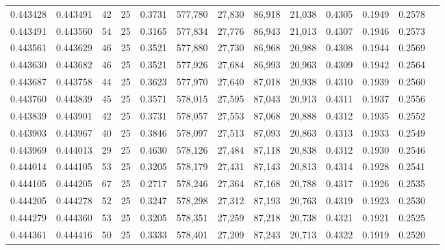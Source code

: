 \begin{tabular}{rrrrrrrrrrrrr}
0.443428 & 0.443491 &    42 &  25 &                                     0.3731 & 577,780 &  27,830 &  86,918 &  21,038 & 0.4305 & 0.1949 & 0.2578 \\
0.443491 & 0.443560 &    54 &  25 &                                     0.3165 & 577,834 &  27,776 &  86,943 &  21,013 & 0.4307 & 0.1946 & 0.2573 \\
0.443561 & 0.443629 &    46 &  25 &                                     0.3521 & 577,880 &  27,730 &  86,968 &  20,988 & 0.4308 & 0.1944 & 0.2569 \\
0.443630 & 0.443682 &    46 &  25 &                                     0.3521 & 577,926 &  27,684 &  86,993 &  20,963 & 0.4309 & 0.1942 & 0.2564 \\
0.443687 & 0.443758 &    44 &  25 &                                     0.3623 & 577,970 &  27,640 &  87,018 &  20,938 & 0.4310 & 0.1939 & 0.2560 \\
0.443760 & 0.443839 &    45 &  25 &                                     0.3571 & 578,015 &  27,595 &  87,043 &  20,913 & 0.4311 & 0.1937 & 0.2556 \\
0.443839 & 0.443901 &    42 &  25 &                                     0.3731 & 578,057 &  27,553 &  87,068 &  20,888 & 0.4312 & 0.1935 & 0.2552 \\
0.443903 & 0.443967 &    40 &  25 &                                     0.3846 & 578,097 &  27,513 &  87,093 &  20,863 & 0.4313 & 0.1933 & 0.2549 \\
0.443969 & 0.444013 &    29 &  25 &                                     0.4630 & 578,126 &  27,484 &  87,118 &  20,838 & 0.4312 & 0.1930 & 0.2546 \\
0.444014 & 0.444105 &    53 &  25 &                                     0.3205 & 578,179 &  27,431 &  87,143 &  20,813 & 0.4314 & 0.1928 & 0.2541 \\
0.444105 & 0.444205 &    67 &  25 &                                     0.2717 & 578,246 &  27,364 &  87,168 &  20,788 & 0.4317 & 0.1926 & 0.2535 \\
0.444205 & 0.444278 &    52 &  25 &                                     0.3247 & 578,298 &  27,312 &  87,193 &  20,763 & 0.4319 & 0.1923 & 0.2530 \\
0.444279 & 0.444360 &    53 &  25 &                                     0.3205 & 578,351 &  27,259 &  87,218 &  20,738 & 0.4321 & 0.1921 & 0.2525 \\
0.444361 & 0.444416 &    50 &  25 &                                     0.3333 & 578,401 &  27,209 &  87,243 &  20,713 & 0.4322 & 0.1919 & 0.2520 \\

\end{tabular}
